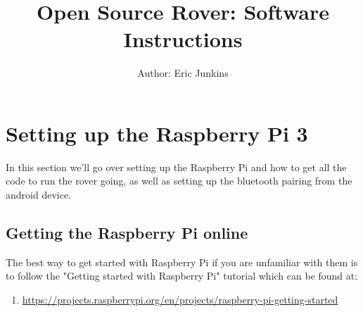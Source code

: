 \documentclass[12pt]{article}
\begin{document}
\title{Open Source Rover: Software Instructions}
\author{Author: Eric Junkins}

\makeatletter         
\def\@maketitle{
\begin{center}	
	\makebox[\textwidth][c]{ \texttt{[image: "Pictures/software title".png]}}
	{\Huge \bfseries \sffamily \@title }\\[3ex] 
	{\Large\sffamily \@author}\\[3ex] 
	\texttt{[image: "Pictures/JPL logo".png]}
\end{center}}
\makeatother

\maketitle



\newpage


\tableofcontents

\newpage


\section{Setting up the Raspberry Pi 3}
In this section we'll go over setting up the Raspberry Pi and how to get all the code to run the rover going, as well as setting up the bluetooth pairing from the android device.
\subsection{Getting the Raspberry Pi online}

The best way to get started with Raspberry Pi if you are unfamiliar with them is to follow the "Getting started with Raspberry Pi" tutorial which can be found at:

\begin{enumerate}
	\item[] \href{https://projects.raspberrypi.org/en/projects/raspberry-pi-getting-started}{https://projects.raspberrypi.org/en/projects/raspberry-pi-getting-started}
\end{enumerate} 
\end{document}
